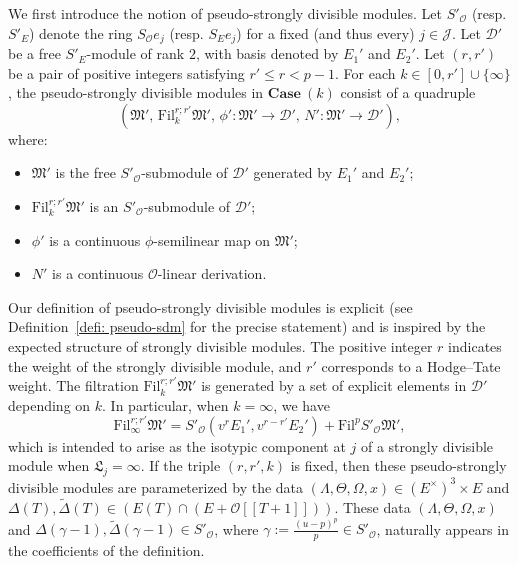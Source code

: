 \documentclass[11pt]{amsart}
\theoremstyle{definition}
\numberwithin{equation}{subsection}
\theoremstyle{plain}
\theoremstyle{plain}
\theoremstyle{plain}
\theoremstyle{plain}
\theoremstyle{plain}
\theoremstyle{plain}
\theoremstyle{plain}
\theoremstyle{plain}
\theoremstyle{plain}
\theoremstyle{plain}
\theoremstyle{plain}
\theoremstyle{plain}
\theoremstyle{definition}
\theoremstyle{definition}
\theoremstyle{definition}
\theoremstyle{remark}
\renewcommand{\(}{\textup{(}}
\renewcommand{\)}{\textup{)}}
\newcommand{\fM}{\mathfrak{M}}
\newcommand{\fL}{\mathfrak{L}}
\newcommand{\Fil}{\mathrm{Fil}}
\newcommand{\cD}{\mathcal{D}}
\newcommand{\cO}{\mathcal{O}}
\newcommand{\cJ}{\mathcal{J}}
\begin{document}
We first introduce the notion of pseudo-strongly divisible modules. Let $S'_\cO$ (resp. $S'_E$) denote the ring $S_\cO e_j$ (resp. $S_E e_j$) for a fixed (and thus every) $j\in\cJ$. Let $\cD'$ be a free $S'_E$-module of rank $2$, with basis denoted by $E_1'$ and $E_2'$. Let $(r,r')$ be a pair of positive integers satisfying $r' \leq r < p-1$. For each $k\in [0,r']\cup\{\infty\}$, the pseudo-strongly divisible modules in $\mathbf{Case}~(k)$ consist of a quadruple
$$
(\fM',\, \Fil^{r;r'}_k \fM',\, \phi': \fM' \to \cD',\, N': \fM' \to \cD'),
$$
where: 
\begin{itemize}[leftmargin=*] 
\item $\fM'$ is the free $S'_\cO$-submodule of $\cD'$ generated by $E_1'$ and $E_2'$; 
\item $\Fil^{r;r'}_k\fM'$ is an $S'_\cO$-submodule of $\cD'$; 
\item $\phi'$ is a continuous $\phi$-semilinear map on $\fM'$; 
\item $N'$ is a continuous $\cO$-linear derivation. 
\end{itemize} 
Our definition of pseudo-strongly divisible modules is explicit (see Definition~\ref{defi: pseudo-sdm} for the precise statement) and is inspired by the expected structure of strongly divisible modules. The positive integer $r$ indicates the weight of the strongly divisible module, and $r'$ corresponds to a Hodge--Tate weight. The filtration $\Fil^{r;r'}_k\fM'$ is generated by a set of explicit elements in $\cD'$ depending on $k$. In particular, when $k=\infty$, we have 
\begin{equation}\label{eq: filtration of pseudo when k=infty} 
\Fil^{r;r'}_\infty\fM' = S'_\cO(v^r E_1', v^{r-r'} E_2') + \Fil^p S'_\cO\fM', 
\end{equation} 
which is intended to arise as the isotypic component at $j$ of a strongly divisible module when $\fL_j = \infty$. If the triple $(r,r',k)$ is fixed, then these pseudo-strongly divisible modules are parameterized by the data $(\Lambda,\Theta,\Omega,x) \in (E^\times)^3 \times E$ and $\Delta(T),\tilde{\Delta}(T) \in (E(T)\cap (E+\cO[[T+1]]))$. These data $(\Lambda,\Theta,\Omega,x)$ and $\Delta(\gamma-1),\tilde{\Delta}(\gamma-1) \in S'_\cO$, where $\gamma:=\frac{(u-p)^p}{p}\in S'_\cO$, naturally appears in the coefficients of the definition.
\end{document}
